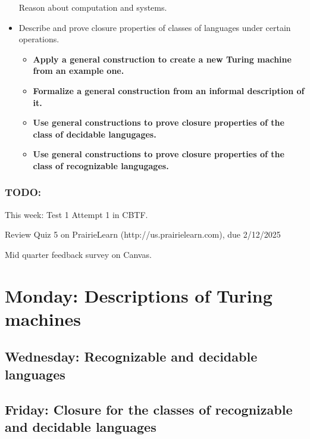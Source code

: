 \begin{itemize}
    Reason about computation and systems.
    \item Describe and prove closure properties of classes of languages under certain operations.
    \begin{itemize}
        \item {\bf Apply a general construction to create a new Turing machine from an example one.}
        \item {\bf Formalize a general construction from an informal description of it.}
        \item {\bf Use general constructions to prove closure properties of the class of decidable langugages.}
        \item {\bf Use general constructions to prove closure properties of the class of recognizable langugages.}
    \end{itemize}
\end{itemize}

\vspace{-20pt}

\subsubsection*{TODO:}
\begin{list}{\itemsep -20pt}
   \item This week: Test 1 Attempt 1 in CBTF. 
   \item Review Quiz 5 on PrairieLearn (http://us.prairielearn.com), due 2/12/2025
   \item Mid quarter feedback survey on Canvas.
\end{list}

\newpage

\section*{Monday: Descriptions of Turing machines}


    
\newpage
\subsection*{Wednesday: Recognizable and decidable languages}




\newpage
\subsection*{Friday: Closure for the classes of recognizable and decidable languages}

